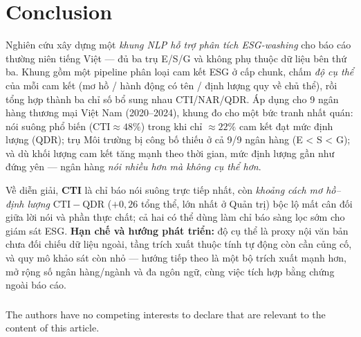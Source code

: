 \documentclass[runningheads]{llncs}
\begin{document}
\section{Conclusion}
\label{sec:conclusion}

Nghiên cứu xây dựng một \emph{khung NLP hỗ trợ phân tích ESG-washing} cho báo cáo thường niên tiếng Việt --- đủ ba trụ E/S/G và không phụ thuộc dữ liệu bên thứ ba. Khung gồm một pipeline phân loại cam kết ESG ở cấp chunk, chấm \emph{độ cụ thể} của mỗi cam kết (mơ hồ / hành động có tên / định lượng quy về chủ thể), rồi tổng hợp thành ba chỉ số bổ sung nhau CTI/NAR/QDR. Áp dụng cho 9 ngân hàng thương mại Việt Nam (2020--2024), khung đo cho một bức tranh nhất quán: nói suông phổ biến ($\mathrm{CTI}\approx48\%$) trong khi chỉ $\approx22\%$ cam kết đạt mức định lượng ($\mathrm{QDR}$); trụ Môi trường bị công bố thiếu ở cả 9/9 ngân hàng (E < S < G); và dù khối lượng cam kết tăng mạnh theo thời gian, mức định lượng gần như đứng yên --- ngân hàng \emph{nói nhiều hơn mà không cụ thể hơn}.

Về diễn giải, \textbf{CTI} là chỉ báo nói suông trực tiếp nhất, còn \emph{khoảng cách mơ hồ--định lượng} $\mathrm{CTI}-\mathrm{QDR}$ ($+0{,}26$ tổng thể, lớn nhất ở Quản trị) bộc lộ mất cân đối giữa lời nói và phần thực chất; cả hai có thể dùng làm chỉ báo sàng lọc sớm cho giám sát ESG. \textbf{Hạn chế và hướng phát triển:} độ cụ thể là proxy nội văn bản chưa đối chiếu dữ liệu ngoài, tầng trích xuất thuộc tính tự động còn cần củng cố, và quy mô khảo sát còn nhỏ --- hướng tiếp theo là một bộ trích xuất mạnh hơn, mở rộng số ngân hàng/ngành và đa ngôn ngữ, cùng việc tích hợp bằng chứng ngoài báo cáo.


\begin{credits}
\subsubsection{\discintname}
The authors have no competing interests to declare that are relevant to the content of this article.
\end{credits}

%


\end{document}

